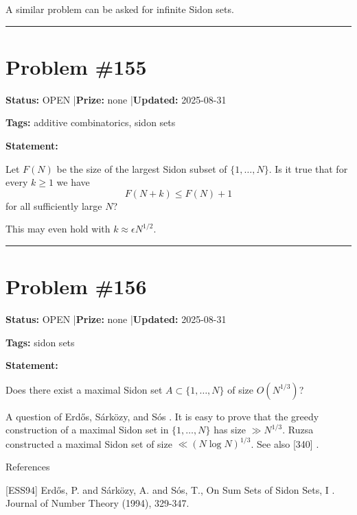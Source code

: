 \documentclass{article}
\begin{document}
A similar problem can be asked for infinite Sidon sets.

\noindent\rule{\linewidth}{0.4pt}


\section{Problem \#155}
\label{prob:155}

\noindent\textbf{Status:} OPEN \quad|\quad \textbf{Prize:} none \quad|\quad \textbf{Updated:} 2025-08-31

\noindent\textbf{Tags:} additive combinatorics, sidon sets

\medskip

\noindent\textbf{Statement:}

Let $F(N)$ be the size of the largest Sidon subset of $\{1,\ldots,N\}$. Is it true that for every $k\geq 1$ we have\[F(N+k)\leq F(N)+1\]for all sufficiently large $N$?




This may even hold with $k\approx \epsilon N^{1/2}$.

\noindent\rule{\linewidth}{0.4pt}


\section{Problem \#156}
\label{prob:156}

\noindent\textbf{Status:} OPEN \quad|\quad \textbf{Prize:} none \quad|\quad \textbf{Updated:} 2025-08-31

\noindent\textbf{Tags:} sidon sets

\medskip

\noindent\textbf{Statement:}

Does there exist a maximal Sidon set $A\subset \{1,\ldots,N\}$ of size $O(N^{1/3})$?




A question of Erd\H{o}s, S\'{a}rk\"{o}zy, and S\'{o}s \cite{ESS94}. It is easy to prove that the greedy construction of a maximal Sidon set in $\{1,\ldots,N\}$ has size $\gg N^{1/3}$. Ruzsa \cite{Ru98b} constructed a maximal Sidon set of size $\ll (N\log N)^{1/3}$. See also [340] .




References

[ESS94] Erd\H{o}s, P. and S\'{a}rk\"{o}zy, A. and S\'{o}s, T., On Sum Sets of Sidon Sets, I . Journal of Number Theory (1994), 329-347.
\end{document}
